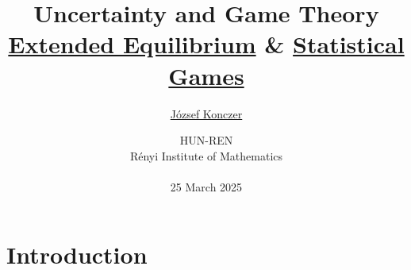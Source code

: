 \documentclass{beamer}
\theoremstyle{definition}
\begin{document}




\title[Uncertainty and Game Theory]{Uncertainty and Game Theory \\ {\small \href{https://arxiv.org/abs/2503.01889}{Extended Equilibrium} \& \href{https://arxiv.org/abs/2402.15892}{Statistical Games}}}
\author{\href{https://konczer.github.io/}{József Konczer}}
\date{HUN-REN  \\ Rényi Institute of Mathematics
\\
\
\\
25 March 2025}

\begin{frame}
\titlepage
\end{frame}





\section{Introduction}
\end{document}
